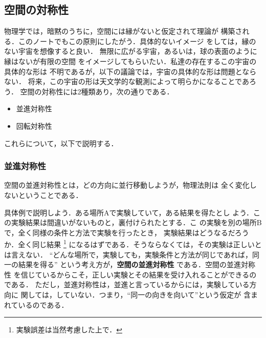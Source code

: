         \subsection{空間の対称性}
            \begin{mycomment}
                物理学では，暗黙のうちに，空間には縁がないと仮定されて理論が
                構築される．このノートでもこの原則にしたがう．具体的ないイメージ
                をしては，縁のない宇宙を想像すると良い．
                無限に広がる宇宙，あるいは，球の表面のように縁はないが有限の空間
                をイメージしてもらいたい．私達の存在するこの宇宙の具体的な形は
                不明であるが，以下の議論では，宇宙の具体的な形は問題とならない．
                将来，この宇宙の形は天文学的な観測によって明らかになることであろう．
                空間の対称性には2種類あり，次の通りである．
                    \begin{itemize}
                        \item 並進対称性
                        \item 回転対称性
                    \end{itemize}
                これらについて，以下で説明する．
            \end{mycomment}
            \subsubsection{並進対称性}
                空間の並進対称性とは，どの方向に並行移動しようが，物理法則は
                全く変化しないということである．

                具体例で説明しよう．ある場所Aで実験していて，ある結果を得たとし
                よう．この実験結果は間違いがないものと，裏付けられたとする．こ
                の実験を別の場所Bで，全く同様の条件と方法で実験を行ったとき，
                実験結果はどうなるだろうか．全く同じ結果
                    \footnote{
                        実験誤差は当然考慮した上で．
                    }
                になるはずである．そうならなくては，その実験は正しいとは言えない．
                “どんな場所で，実験しても，実験条件と方法が同じであれば，同一の結果を得る”
                という考え方が，\textbf{空間の並進対称性} である．空間の並進対称性
                を信じているからこそ，正しい実験とその結果を受け入れることができるのである．
                ただし，並進対称性は，並進と言っているからには，実験している方向に
                関しては，していない．つまり，“同一の向きを向いて”という仮定が
                含まれているのである．

